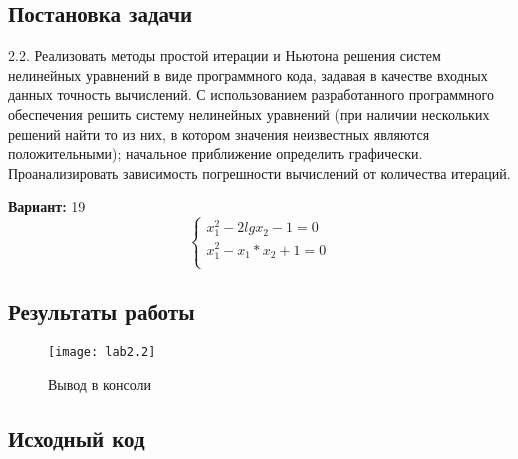 \subsection{Постановка задачи}
2.2. Реализовать методы простой итерации и Ньютона решения систем нелинейных уравнений в виде программного кода, задавая в качестве входных данных точность вычислений. С использованием разработанного программного обеспечения решить систему нелинейных уравнений (при наличии нескольких решений найти то из них, в котором значения неизвестных являются положительными); начальное приближение определить графически. Проанализировать зависимость погрешности вычислений от количества итераций. 

{\bfseries Вариант:} 19
    \begin{equation}
        \left\{ 
        \begin{array}{ll} 
        x^2_1 - 2lgx_2-1=0\\
        x^2_1-x_1*x_2 + 1 = 0\\
        \end{array}\right.
    \end{equation}
\pagebreak

\subsection{Результаты работы}
\begin{figure}[h!]
\centering
\texttt{[image: lab2.2]}
\caption{Вывод в консоли}
\end{figure}


\subsection{Исходный код}

\pagebreak

